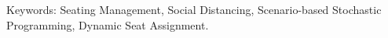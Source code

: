 Keywords: Seating Management, Social Distancing, Scenario-based Stochastic Programming, Dynamic Seat Assignment.



